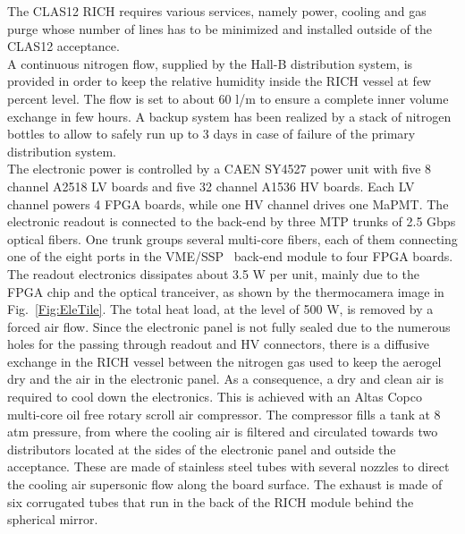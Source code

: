 \documentclass[5p,times,twocolumn]{elsarticle}
\begin{document}
The CLAS12 RICH requires various services, namely power, cooling and gas purge whose number of lines has to be minimized and installed outside of the CLAS12 acceptance.\\
A continuous nitrogen flow, supplied by the Hall-B distribution system, is provided in order to keep the relative humidity inside the RICH vessel at few percent level. The flow is set to about 60 l/m to ensure a complete inner volume exchange in few hours. 
A backup system has been realized by a stack of nitrogen bottles to allow to safely run up to 3 days in case of failure of the primary distribution system.\\
The electronic power is controlled by a CAEN SY4527 power unit with five 8 channel A2518 LV boards and five 32 channel A1536 HV boards. Each LV channel powers 4 FPGA boards, while one HV channel drives one MaPMT. The electronic readout is connected to the back-end by three MTP trunks of 2.5 Gbps optical fibers. One trunk groups several multi-core fibers, each of them connecting one of the eight ports in the VME/SSP~\cite{XXX} back-end module to four FPGA boards.\\
The readout electronics dissipates about 3.5 W per unit, mainly due to the FPGA chip and the optical tranceiver, as shown by the thermocamera image in Fig.~\ref{Fig:EleTile}. The total heat load, at the level of 500 W, is removed by a forced air flow. Since the electronic panel is not fully sealed due to the numerous holes for the passing through readout and HV connectors, there is a diffusive exchange in the RICH vessel between the nitrogen gas used to keep the aerogel dry and the air in the electronic panel. As a consequence, a dry and clean air is required to cool down the electronics. This is achieved with an Altas Copco multi-core oil free rotary scroll air compressor. The compressor fills a tank at 8 atm pressure, from where the cooling air is filtered and circulated towards two distributors located at the sides of the electronic panel and outside the acceptance. These are made of stainless steel tubes with several nozzles to direct the cooling air supersonic flow along the board surface. The exhaust is made of six corrugated tubes that run in the back of the RICH module behind the spherical mirror.
\end{document}
